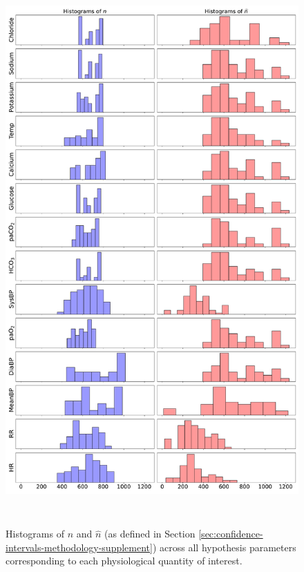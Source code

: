 \begin{figure}[t]
    \centering
    \includegraphics[height=21cm]{figures/causal/latest_experimental_results/nhistograms_nogray.pdf}
    \caption{Histograms of $n$ and $\widehat{n}$ (as defined in Section \ref{sec:confidence-intervals-methodology-supplement}) across all hypothesis parameters corresponding to each physiological quantity of interest.}
    \label{fig:n_histograms}
\end{figure}

